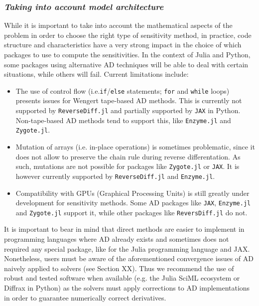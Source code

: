\subsubsection*{\textit{Taking into account model architecture}}

While it is important to take into account the mathematical aspects of the problem in order to choose the right type of sensitivity method, in practice, code structure and characteristics have a very strong impact in the choice of which packages to use to compute the sensitivities. 
In the context of Julia and Python, some packages using alternative AD techniques will be able to deal with certain situations, while others will fail. 
Current limitations include:
\begin{itemize}
    \item The use of control flow (i.e.\texttt{if}/\texttt{else} statements; \texttt{for} and \texttt{while} loops) presents issues for Wengert tape-based AD methods. 
    This is currently not supported by \texttt{ReverseDiff.jl} and partially supported by \texttt{JAX} in Python. 
    Non-tape-based AD methods tend to support this, like \texttt{Enzyme.jl} and \texttt{Zygote.jl}.
    \item Mutation of arrays (i.e. in-place operations) is sometimes problematic, since it does not allow to preserve the chain rule during reverse differentation. As such, mutations are not possible for packages like \texttt{Zygote.jl} or \texttt{JAX}. It is however currently supported by \texttt{ReverseDiff.jl} and \texttt{Enzyme.jl}.
    \item Compatibility with GPUs (Graphical Processing Units) is still greatly under development for sensitivity methods. 
    Some AD packages like \texttt{JAX}, \texttt{Enzyme.jl} and \texttt{Zygote.jl} support it, while other packages like \texttt{ReversDiff.jl} do not. 
\end{itemize}

It is important to bear in mind that direct methods are easier to implement in programming languages where AD already exists and sometimes does not required any special package, like for the Julia programming language and JAX.
Nonetheless, users must be aware of the aforementioned convergence issues of AD naively applied to solvers (see Section XX). 
Thus we recommend the use of robust and tested software when available (e.g. the Julia SciML ecosystem or Diffrax in Python) as the solvers must apply corrections to AD implementations in order to guarantee numerically correct derivatives.

